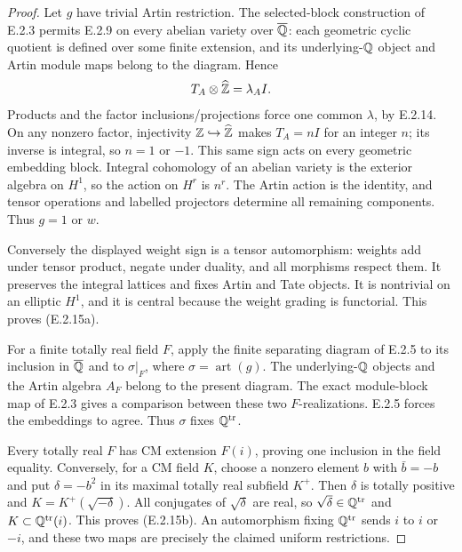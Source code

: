 \begin{proof}
Let \(g\) have trivial Artin restriction. The selected-block
construction of E.2.3 permits E.2.9 on every abelian variety over
\(\overline{\mathbb Q}\): each geometric cyclic quotient is defined over some
finite extension, and its underlying-\(\mathbb Q\) object and Artin
module maps belong to the diagram. Hence
\[
 T_A\otimes\widehat{\mathbb Z}=\lambda_A I .
\]
Products and the factor inclusions/projections force one common
\(\lambda\), by E.2.14. On any nonzero factor, injectivity
\(\mathbb Z\hookrightarrow\widehat{\mathbb Z}\) makes \(T_A=nI\) for an integer
\(n\); its inverse is integral, so \(n=1\) or \(-1\).
This same sign acts on every geometric embedding block.
Integral cohomology of an abelian variety is the exterior algebra
on \(H^1\), so the action on \(H^r\) is \(n^r\).
The Artin action is the identity, and tensor operations and
labelled projectors determine all remaining components.
Thus \(g=1\) or \(w\).

Conversely the displayed weight sign is a tensor automorphism:
weights add under tensor product, negate under duality, and all
morphisms respect them. It preserves the integral lattices and
fixes Artin and Tate objects. It is nontrivial on an elliptic
\(H^1\), and it is central because the weight grading is
functorial. This proves (E.2.15a).

For a finite totally real field \(F\), apply the finite separating
diagram of E.2.5 to its inclusion in \(\overline{\mathbb Q}\) and to
\(\sigma|_F\), where \(\sigma=\operatorname{art}(g)\).
The underlying-\(\mathbb Q\) objects and the Artin algebra \(A_F\)
belong to the present diagram. The exact module-block map of
E.2.3 gives a comparison between these two \(F\)-realizations.
E.2.5 forces the embeddings to agree. Thus \(\sigma\) fixes
\(\mathbb Q^{\mathrm{tr}}\).

Every totally real \(F\) has CM extension \(F(i)\), proving one
inclusion in the field equality. Conversely, for a CM field
\(K\), choose a nonzero element \(b\) with \(\bar b=-b\) and
put \(\delta=-b^2\) in its maximal totally real subfield \(K^+\).
Then \(\delta\) is totally positive and
\(K=K^+(\sqrt{-\delta})\).
All conjugates of \(\sqrt{\delta}\) are real, so
\(\sqrt{\delta}\in\mathbb Q^{\mathrm{tr}}\) and
\(K\subset\mathbb Q^{\mathrm{tr}}(i)\).
This proves (E.2.15b). An automorphism fixing \(\mathbb Q^{\mathrm{tr}}\)
sends \(i\) to \(i\) or \(-i\), and these two maps are precisely
the claimed uniform restrictions.
\end{proof}

